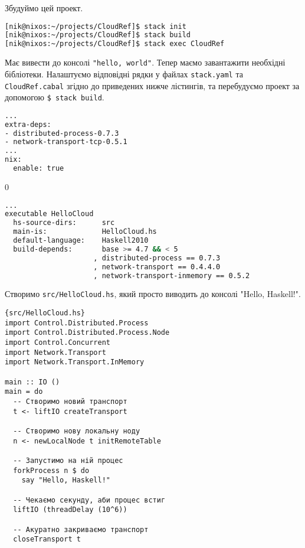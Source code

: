 \documentclass[12pt]{article}
\begin{document}
Збудуймо цей проект.

\begin{lstlisting}[language=bash, caption={Будування та запуск проекту}]
[nik@nixos:~/projects/CloudRef]$ stack init
[nik@nixos:~/projects/CloudRef]$ stack build
[nik@nixos:~/projects/CloudRef]$ stack exec CloudRef
\end{lstlisting}

Має вивести до консолі \lstinline{"hello, world"}. Тепер маємо завантажити необхідні бібліотеки. Налаштуємо відповідні рядки у файлах \lstinline{stack.yaml} та \lstinline{CloudRef.cabal} згідно до приведених нижче лістингів, та перебудуємо проект за допомогою \lstinline{$ stack build}.\\

\begin{lstlisting}[language=bash, caption={stack.yaml}]
...
extra-deps:
- distributed-process-0.7.3
- network-transport-tcp-0.5.1
...
nix:
  enable: true
\end{lstlisting}
0
\begin{lstlisting}[language=bash, caption={CloudRef.cabal}]
...
executable HelloCloud
  hs-source-dirs:      src
  main-is:             HelloCloud.hs
  default-language:    Haskell2010
  build-depends:       base >= 4.7 && < 5
                     , distributed-process == 0.7.3
                     , network-transport == 0.4.4.0
                     , network-transport-inmemory == 0.5.2
\end{lstlisting}

Створимо \lstinline{src/HelloCloud.hs}, який просто виводить до консолі "Hello, Haskell!".\\

\begin{lstlisting}{src/HelloCloud.hs}
import Control.Distributed.Process
import Control.Distributed.Process.Node 
import Control.Concurrent
import Network.Transport
import Network.Transport.InMemory 

main :: IO ()
main = do
  -- Створимо новий транспорт
  t <- liftIO createTransport

  -- Створимо нову локальну ноду
  n <- newLocalNode t initRemoteTable

  -- Запустимо на ній процес
  forkProcess n $ do
    say "Hello, Haskell!"

  -- Чекаємо секунду, аби процес встиг
  liftIO (threadDelay (10^6))

  -- Акуратно закриваємо транспорт
  closeTransport t

\end{lstlisting}
\end{document}
